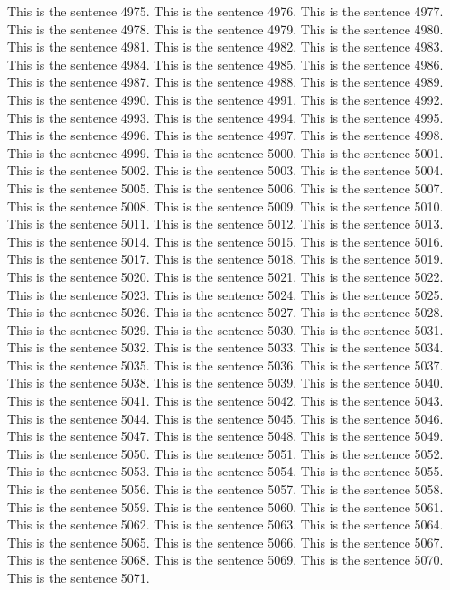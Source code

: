 \documentclass{article}
\begin{document}
This is the sentence 4975.
This is the sentence 4976.
This is the sentence 4977.
This is the sentence 4978.
This is the sentence 4979.
This is the sentence 4980.
This is the sentence 4981.
This is the sentence 4982.
This is the sentence 4983.
This is the sentence 4984.
This is the sentence 4985.
This is the sentence 4986.
This is the sentence 4987.
This is the sentence 4988.
This is the sentence 4989.
This is the sentence 4990.
This is the sentence 4991.
This is the sentence 4992.
This is the sentence 4993.
This is the sentence 4994.
This is the sentence 4995.
This is the sentence 4996.
This is the sentence 4997.
This is the sentence 4998.
This is the sentence 4999.
This is the sentence 5000.
This is the sentence 5001.
This is the sentence 5002.
This is the sentence 5003.
This is the sentence 5004.
This is the sentence 5005.
This is the sentence 5006.
This is the sentence 5007.
This is the sentence 5008.
This is the sentence 5009.
This is the sentence 5010.
This is the sentence 5011.
This is the sentence 5012.
This is the sentence 5013.
This is the sentence 5014.
This is the sentence 5015.
This is the sentence 5016.
This is the sentence 5017.
This is the sentence 5018.
This is the sentence 5019.
This is the sentence 5020.
This is the sentence 5021.
This is the sentence 5022.
This is the sentence 5023.
This is the sentence 5024.
This is the sentence 5025.
This is the sentence 5026.
This is the sentence 5027.
This is the sentence 5028.
This is the sentence 5029.
This is the sentence 5030.
This is the sentence 5031.
This is the sentence 5032.
This is the sentence 5033.
This is the sentence 5034.
This is the sentence 5035.
This is the sentence 5036.
This is the sentence 5037.
This is the sentence 5038.
This is the sentence 5039.
This is the sentence 5040.
This is the sentence 5041.
This is the sentence 5042.
This is the sentence 5043.
This is the sentence 5044.
This is the sentence 5045.
This is the sentence 5046.
This is the sentence 5047.
This is the sentence 5048.
This is the sentence 5049.
This is the sentence 5050.
This is the sentence 5051.
This is the sentence 5052.
This is the sentence 5053.
This is the sentence 5054.
This is the sentence 5055.
This is the sentence 5056.
This is the sentence 5057.
This is the sentence 5058.
This is the sentence 5059.
This is the sentence 5060.
This is the sentence 5061.
This is the sentence 5062.
This is the sentence 5063.
This is the sentence 5064.
This is the sentence 5065.
This is the sentence 5066.
This is the sentence 5067.
This is the sentence 5068.
This is the sentence 5069.
This is the sentence 5070.
This is the sentence 5071.
\end{document}
